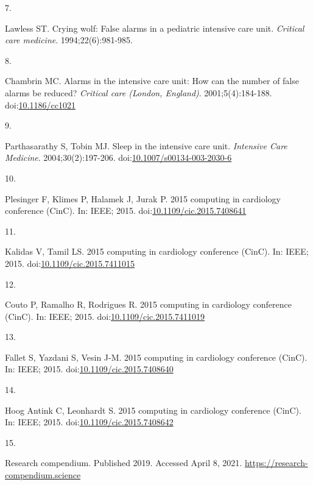 \documentclass[12pt,twoside]{reedthesis}
\newlength{\csllabelwidth}
\newlength{\cslhangindent}
\newenvironment{CSLReferences}[2] %
 {%
  \setlength{\parindent}{0pt}
  \ifodd #1 \everypar{\setlength{\hangindent}{\cslhangindent}}\ignorespaces\fi
  \ifnum #2 > 0
  \setlength{\parskip}{#2\baselineskip}
  \fi
 }%
 {}
\newcommand{\CSLLeftMargin}[1]{\parbox[t]{\csllabelwidth}{#1}}
\newcommand{\CSLRightInline}[1]{\parbox[t]{\linewidth - \csllabelwidth}{#1}}
\begin{document}
\begin{CSLReferences}{0}{0}
\leavevmode{}%
\CSLLeftMargin{7. }
\CSLRightInline{Lawless ST. Crying wolf: False alarms in a pediatric intensive care unit. \emph{Critical care medicine}. 1994;22(6):981-985.}

\leavevmode{}%
\CSLLeftMargin{8. }
\CSLRightInline{Chambrin MC. Alarms in the intensive care unit: How can the number of false alarms be reduced? \emph{Critical care (London, England)}. 2001;5(4):184-188. doi:\href{https://doi.org/10.1186/cc1021}{10.1186/cc1021}}

\leavevmode{}%
\CSLLeftMargin{9. }
\CSLRightInline{Parthasarathy S, Tobin MJ. Sleep in the intensive care unit. \emph{Intensive Care Medicine}. 2004;30(2):197-206. doi:\href{https://doi.org/10.1007/s00134-003-2030-6}{10.1007/s00134-003-2030-6}}

\leavevmode{}%
\CSLLeftMargin{10. }
\CSLRightInline{Plesinger F, Klimes P, Halamek J, Jurak P. 2015 computing in cardiology conference (CinC). In: IEEE; 2015. doi:\href{https://doi.org/10.1109/cic.2015.7408641}{10.1109/cic.2015.7408641}}

\leavevmode{}%
\CSLLeftMargin{11. }
\CSLRightInline{Kalidas V, Tamil LS. 2015 computing in cardiology conference (CinC). In: IEEE; 2015. doi:\href{https://doi.org/10.1109/cic.2015.7411015}{10.1109/cic.2015.7411015}}

\leavevmode{}%
\CSLLeftMargin{12. }
\CSLRightInline{Couto P, Ramalho R, Rodrigues R. 2015 computing in cardiology conference (CinC). In: IEEE; 2015. doi:\href{https://doi.org/10.1109/cic.2015.7411019}{10.1109/cic.2015.7411019}}

\leavevmode{}%
\CSLLeftMargin{13. }
\CSLRightInline{Fallet S, Yazdani S, Vesin J-M. 2015 computing in cardiology conference (CinC). In: IEEE; 2015. doi:\href{https://doi.org/10.1109/cic.2015.7408640}{10.1109/cic.2015.7408640}}

\leavevmode{}%
\CSLLeftMargin{14. }
\CSLRightInline{Hoog Antink C, Leonhardt S. 2015 computing in cardiology conference (CinC). In: IEEE; 2015. doi:\href{https://doi.org/10.1109/cic.2015.7408642}{10.1109/cic.2015.7408642}}

\leavevmode{}%
\CSLLeftMargin{15. }
\CSLRightInline{Research compendium. Published 2019. Accessed April 8, 2021. \url{https://research-compendium.science}}


\end{CSLReferences}
\end{document}
